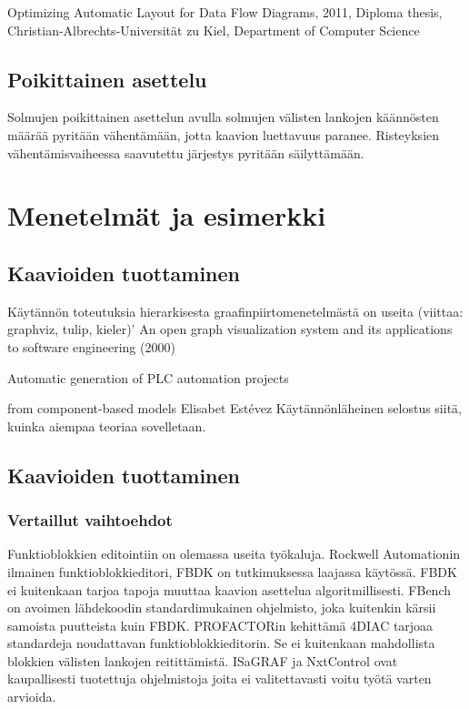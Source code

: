 \documentclass[finnish,12pt]{article}
\begin{document}
Optimizing Automatic Layout for Data Flow Diagrams, 2011, Diploma thesis, Christian-Albrechts-Universität zu Kiel, Department of Computer Science

		\subsection{Poikittainen asettelu}

Solmujen poikittainen asettelun avulla solmujen välisten lankojen käännösten määrää pyritään vähentämään, jotta kaavion luettavuus paranee. Risteyksien vähentämisvaiheessa saavutettu järjestys pyritään säilyttämään.

	\clearpage
	\section{Menetelmät ja esimerkki}
		\subsection{Kaavioiden tuottaminen}

Käytännön toteutuksia hierarkisesta graafinpiirtomenetelmästä on useita (viittaa: graphviz, tulip, kieler)’
An open graph visualization system and its applications to software engineering (2000) 

Automatic generation of PLC automation projects

from component-based models
Elisabet Estévez
Käytännönläheinen selostus siitä, kuinka aiempaa teoriaa sovelletaan.

		\subsection{Kaavioiden tuottaminen}
			\subsubsection{Vertaillut vaihtoehdot}
	
Funktioblokkien editointiin on olemassa useita työkaluja.
Rockwell Automationin ilmainen funktioblokkieditori, FBDK on tutkimuksessa laajassa käytössä.
FBDK ei kuitenkaan tarjoa tapoja muuttaa kaavion asettelua algoritmillisesti.
FBench on avoimen lähdekoodin standardimukainen ohjelmisto, joka kuitenkin kärsii samoista puutteista kuin FBDK.
PROFACTORin kehittämä 4DIAC tarjoaa standardeja noudattavan funktioblokkieditorin.
Se ei kuitenkaan mahdollista blokkien välisten lankojen reitittämistä.
ISaGRAF ja NxtControl ovat kaupallisesti tuotettuja ohjelmistoja joita ei valitettavasti voitu työtä varten arvioida.
\end{document}
